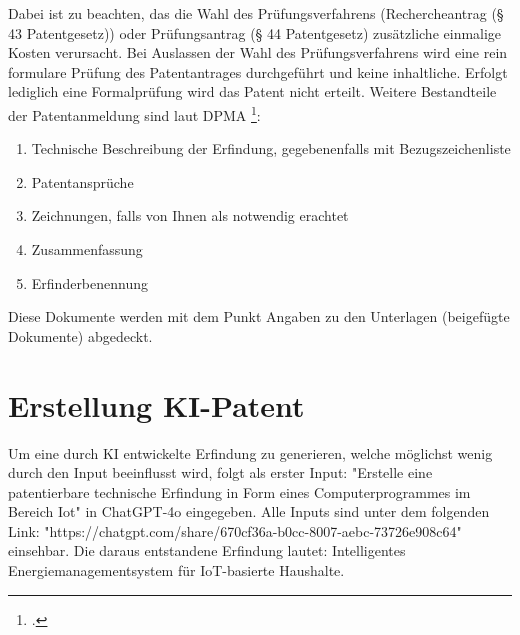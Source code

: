 Dabei ist zu beachten, das die Wahl des Prüfungsverfahrens 
(Rechercheantrag (§ 43 Patentgesetz)) oder
Prüfungsantrag (§ 44 Patentgesetz) zusätzliche einmalige Kosten verursacht.
Bei Auslassen der Wahl des Prüfungsverfahrens wird eine rein formulare
Prüfung des Patentantrages durchgeführt und keine inhaltliche.
Erfolgt lediglich eine Formalprüfung wird das Patent nicht erteilt.
Weitere Bestandteile der Patentanmeldung sind laut DPMA \footcite{DPMAAnmeldung}:

\begin{enumerate}
	\item Technische Beschreibung der Erfindung, gegebenenfalls mit Bezugszeichenliste
	\item Patentansprüche
	\item Zeichnungen, falls von Ihnen als notwendig erachtet
	\item Zusammenfassung
	\item Erfinderbenennung
\end{enumerate}

Diese Dokumente werden mit dem Punkt Angaben 
zu den Unterlagen (beigefügte Dokumente) abgedeckt.

\section{Erstellung KI-Patent}

Um eine durch KI entwickelte Erfindung zu generieren, 
welche möglichst wenig durch den Input beeinflusst wird, 
folgt als erster Input:
"Erstelle eine patentierbare technische Erfindung 
in Form eines Computerprogrammes im Bereich Iot" 
in ChatGPT-4o eingegeben.
Alle Inputs sind unter dem folgenden Link:
"https://chatgpt.com/share/670cf36a-b0cc-8007-aebc-73726e908c64"
einsehbar.
Die daraus entstandene Erfindung lautet:
Intelligentes Energiemanagementsystem für \gls{IoT}-basierte Haushalte.

